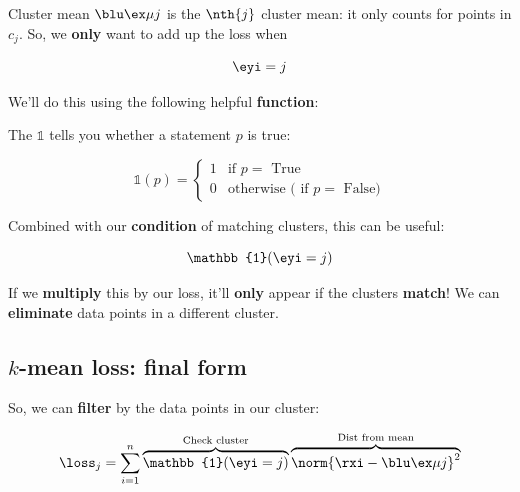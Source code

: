         Cluster mean $\bmuj$ is the $\nth{j}$ cluster mean: it only counts for points in $c_j$. So, we \textbf{only} want to add up the loss when 
        
        \begin{equation}
            \eyi = j
        \end{equation}
        
        We'll do this using the following helpful \textbf{function}:\\
        
        \begin{notation}
            The  $\mathbb{1}$ tells you whether a statement $p$ is true:
            
            \begin{equation*}
                \mathbb{1}(p) = 
                \begin{cases}
                    1 & \text{if $p=$ True} \\
                    0 & \text{otherwise ( if $p=$ False)}
                \end{cases}
            \end{equation*}
        \end{notation}
        
        Combined with our \textbf{condition} of matching clusters, this can be useful:
        
        \begin{equation}
            \mathbb{1}(\eyi = j)
        \end{equation}
        
        If we \textbf{multiply} this by our loss, it'll \textbf{only} appear if the clusters \textbf{match}! We can \textbf{eliminate} data points in a different cluster.
        
    \subsection{$k$-mean loss: final form}
    
        So, we can \textbf{filter} by the data points in our cluster:
        
        \begin{equation}
            \loss_j =
            \sum_{i=1}^n 
                \overbrace{
                    \mathbb{1}(\eyi = j)
                }^{ \text{Check cluster}}
                \overbrace{
                    \norm{ \rxi - \bmuj }^2 
                }^{\text{Dist from mean} }
        \end{equation}
        
